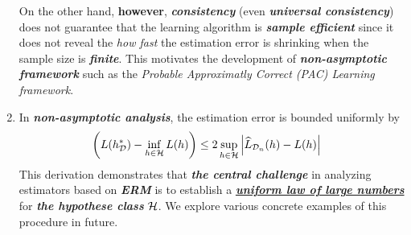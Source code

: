 \documentclass[11pt]{article}
\begin{document}
\begin{remark}
\begin{enumerate}
On the other hand, \textbf{however}, \emph{\textbf{consistency}} (even \emph{\textbf{universal consistency}}) does not guarantee that the learning algorithm is \emph{\textbf{sample efficient}} since it does not reveal the \emph{how fast} the estimation error is shrinking when the sample size is \emph{\textbf{finite}}. This motivates the development of \emph{\textbf{non-asymptotic framework}} such as the \emph{Probable Approximatly Correct (PAC) Learning framework}. 

\item In \emph{\textbf{non-asymptotic analysis}}, the estimation error is bounded uniformly by  
\begin{align*}
\left(L(h_{{\mathcal D}}^{*})  - \inf_{h \in {\mathcal H}}L(h)\right) &\le 2 \sup_{h \in {\mathcal H}}\left\lvert \widehat{L}_{{\mathcal D}_n}(h) - L(h) \right\rvert
\end{align*} This derivation demonstrates that \emph{\textbf{the central challenge}} in analyzing estimators based on \emph{\textbf{ERM}} is to establish a \underline{\emph{\textbf{uniform law of large numbers}}} for \emph{\textbf{the hypothese class}} ${\mathcal H}$. We explore various concrete examples of this procedure in future.
\end{enumerate}

\end{remark}
\end{document}
